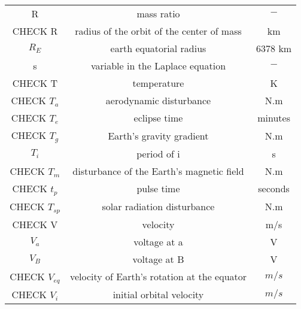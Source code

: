 \begin{center}
\begin{longtable}{c|c|c}
R 																	& mass ratio 																	& $-$ \\

CHECK R														& radius of the orbit of the center of mass 	& km \\

$R_E$ 															& earth equatorial radius 										& 6378 km \\

s 																	& variable in the Laplace equation 						& $-$ \\

CHECK T 																	& temperature 																& K \\

CHECK $T_a$                             & aerodynamic disturbance                           & N.m \\

CHECK $T_e$                              & eclipse time                             & minutes \\

CHECK $T_g$                          & Earth's gravity gradient                         & N.m \\

$T_i$ 															& period of i																	& s \\

CHECK $T_m$                         & disturbance of the Earth's magnetic field     & N.m \\

CHECK $t_p$                          & pulse time                         & seconds \\

CHECK $T_{sp}$                        & solar radiation disturbance                 & N.m \\

CHECK V																		& velocity																		& m/s \\

$V_a$ 															& voltage at a 																& V \\

$V_B$ 															& voltage at B 																& V \\

CHECK $V_{eq}$                            & velocity of Earth's rotation at the equator & $m/s$ \\

CHECK $V_i$                               & initial orbital velocity      & $m/s$ \\


\end{longtable}
\end{center}
